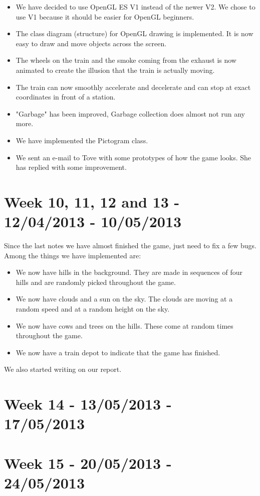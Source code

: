 \begin{itemize}
\item We have decided to use OpenGL ES V1 instead of the newer V2. We chose to use V1 because it should be easier for OpenGL beginners. 
\item The class diagram (structure) for OpenGL drawing is implemented. It is now easy to draw and move objects across the screen. 
\item The wheels on the train and the smoke coming from the exhaust is now animated to create the illusion that the train is actually moving. 
\item The train can now smoothly accelerate and decelerate and can stop at exact coordinates in front of a station. 
\item "Garbage" has been improved, Garbage collection does almost not run any more. 
\item We have implemented the Pictogram class.
\item We sent an e-mail to Tove with some prototypes of how the game looks. She has replied with some improvement.
\end{itemize} 

\section*{Week 10, 11, 12 and 13 - 12/04/2013 - 10/05/2013}
Since the last notes we have almost finished the game, just need to fix a few bugs. Among the things we have implemented are:

\begin{itemize}
\item We now have hills in the background. They are made in sequences of four hills and are randomly picked throughout the game. 
\item We now have clouds and a sun on the sky. The clouds are moving at a random speed and at a random height on the sky. 
\item We now have cows and trees on the hills. These come at random times throughout the game.
\item We now have a train depot to indicate that the game has finished. 
\end{itemize}
We also started writing on our report. 

\section*{Week 14 - 13/05/2013 - 17/05/2013}
\section*{Week 15 - 20/05/2013 - 24/05/2013}
